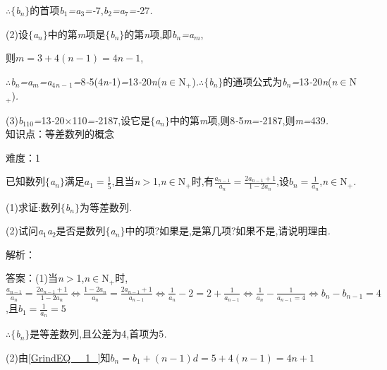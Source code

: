 \documentclass{article} %
\begin{document}
\textit{$\therefore$}$\mathrm{\{}$\textit{b${}_{n}$}$\mathrm{\}}$的首项\textit{b}${}_{1}$\textit{=a}${}_{3}$\textit{=-}7,\textit{b}${}_{2}$\textit{=a}${}_{7}$\textit{=-}27\textit{.}

(2)设$\mathrm{\{}$\textit{a${}_{n}$}$\mathrm{\}}$中的第\textit{m}项是$\mathrm{\{}$\textit{b${}_{n}$}$\mathrm{\}}$的第\textit{n}项,即\textit{b${}_{n}$=a${}_{m}$},

则$m = 3+4(n-1) = 4n-1$,

\textit{$\therefore$b${}_{n}$=a${}_{m}$=a}${}_{4}$\textit{${}_{n-}$}${}_{1}$\textit{=}8\textit{-}5(4\textit{n-}1)\textit{=}13\textit{-}20\textit{n}(\textit{n}$\mathrm{\in}$N\textit{${}_{+}$})\textit{.$\therefore$}$\mathrm{\{}$\textit{b${}_{n}$}$\mathrm{\}}$的通项公式为\textit{b${}_{n}$=}13\textit{-}20\textit{n}(\textit{n}$\mathrm{\in}$N\textit{${}_{+}$})\textit{.}

(3)\textit{b}${}_{110}$\textit{=}13\textit{-}20\textit{$\times$}110\textit{=-}2187,设它是$\mathrm{\{}$\textit{a${}_{n}$}$\mathrm{\}}$中的第\textit{m}项,则8\textit{-}5\textit{m=-}2187,则\textit{m=}439\textit{.} \\

知识点：等差数列的概念

难度：1

	 已知数列$\mathrm{\{}$\textit{a${}_{n}$}$\mathrm{\}}$满足$a_1 = \frac{1}{5}$,且当\textit{n$>$}1,\textit{n}$\mathrm{\in}$N\textit{${}_{+}$}时,有$\frac{a_{n-1}}{a_n} = \frac{2a_{n-1}+1}{1-2a_n}$,设$b_n = \frac{1}{a_n}$,\textit{n}$\mathrm{\in}$N\textit{${}_{+}$.}

 (1)求证:数列$\mathrm{\{}$\textit{b${}_{n}$}$\mathrm{\}}$为等差数列\textit{.}

 (2)试问\textit{a}${}_{1}$\textit{a}${}_{2}$是否是数列$\mathrm{\{}$\textit{a${}_{n}$}$\mathrm{\}}$中的项?如果是,是第几项?如果不是,请说明理由\textit{.}

解析：

	 答案：(1)当\textit{n$>$}1,\textit{n}$\mathrm{\in}$N\textit{${}_{+}$}时,$\frac{a_{n-1}}{a_n} = \frac{2a_{n-1}+1}{1-2a_n} \Leftrightarrow \frac{1-2a_n}{a_n} = \frac{2a_{n-1}+1}{a_{n-1}} \Leftrightarrow \frac{1}{a_n}-2 = 2+\frac{1}{a_{n-1}} \Leftrightarrow \frac{1}{a_n} -\frac{1}{a_{n-1} = 4} \Leftrightarrow b_n - b_{n-1} = 4$,且$b_1=\frac{1}{a_n } = 5$

\textit{$\therefore$}$\mathrm{\{}$\textit{b${}_{n}$}$\mathrm{\}}$是等差数列,且公差为4,首项为5\textit{.}

(2)由\eqref{GrindEQ__1_}知$b_n = b_1 + (n-1)d = 5 + 4(n-1) = 4n+1$
\end{document}
